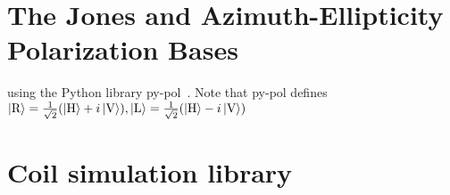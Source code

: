 \renewcommand{\imagepath}{../90-appendix/img}

\appendix
\chapter{The Jones and Azimuth-Ellipticity Polarization Bases}\label{ch:pypol_trafos}

using the Python library py-pol~\cite{noauthor_python_nodate}. Note that py-pol defines $\Ket{\text{R}} = \frac{1}{\sqrt{2}}(\Ket{\text{H}}+i\Ket{\text{V}}), \Ket{\text{L}} = \frac{1}{\sqrt{2}}(\Ket{\text{H}}-i\Ket{\text{V}})$

\chapter{Coil simulation library}\label{ch:coil_simulation_library}
